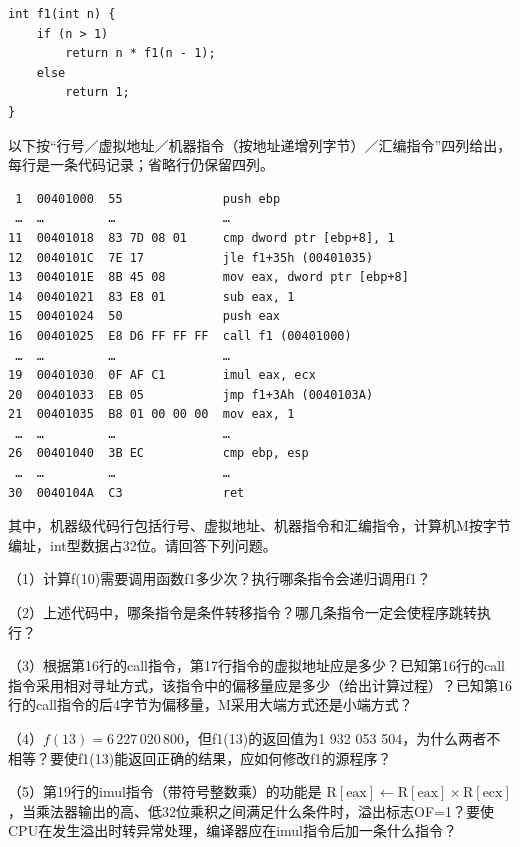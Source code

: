\par\medskip\noindent
\begin{minipage}{\linewidth}
\begin{verbatim}
int f1(int n) {
    if (n > 1)
        return n * f1(n - 1);
    else
        return 1;
}
\end{verbatim}
\end{minipage}\par\medskip

以下按``行号／虚拟地址／机器指令（按地址递增列字节）／汇编指令''四列给出，每行是一条代码记录；省略行仍保留四列。

\par\medskip\noindent
\begin{minipage}{\linewidth}
\begin{verbatim}
 1  00401000  55              push ebp
 …  …         …               …
11  00401018  83 7D 08 01     cmp dword ptr [ebp+8], 1
12  0040101C  7E 17           jle f1+35h (00401035)
13  0040101E  8B 45 08        mov eax, dword ptr [ebp+8]
14  00401021  83 E8 01        sub eax, 1
15  00401024  50              push eax
16  00401025  E8 D6 FF FF FF  call f1 (00401000)
 …  …         …               …
19  00401030  0F AF C1        imul eax, ecx
20  00401033  EB 05           jmp f1+3Ah (0040103A)
21  00401035  B8 01 00 00 00  mov eax, 1
 …  …         …               …
26  00401040  3B EC           cmp ebp, esp
 …  …         …               …
30  0040104A  C3              ret
\end{verbatim}
\end{minipage}\par\medskip

其中，机器级代码行包括行号、虚拟地址、机器指令和汇编指令，计算机M按字节编址，int型数据占32位。请回答下列问题。

（1）计算f(10)需要调用函数f1多少次？执行哪条指令会递归调用f1？

（2）上述代码中，哪条指令是条件转移指令？哪几条指令一定会使程序跳转执行？

（3）根据第16行的call指令，第17行指令的虚拟地址应是多少？已知第16行的call指令采用相对寻址方式，该指令中的偏移量应是多少（给出计算过程）？已知第16行的call指令的后4字节为偏移量，M采用大端方式还是小端方式？

（4）\(f(13)=6\,227\,020\,800\)，但f1(13)的返回值为1 932 053 504，为什么两者不相等？要使f1(13)能返回正确的结果，应如何修改f1的源程序？

（5）第19行的imul指令（带符号整数乘）的功能是 \(\mathrm R[\mathrm{eax}]\leftarrow\mathrm R[\mathrm{eax}]\times\mathrm R[\mathrm{ecx}]\)，当乘法器输出的高、低32位乘积之间满足什么条件时，溢出标志OF=1？要使CPU在发生溢出时转异常处理，编译器应在imul指令后加一条什么指令？

